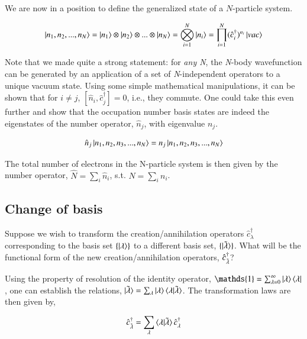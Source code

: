 \documentclass{resonance}
\begin{document}
We are now in a position to define the generalized state of a $N$-particle system. 

\begin{equation*}
    \ket{n_{1}, n_{2},..., n_{N}} = \ket{n_{1}} \otimes \ket{n_{2}} \otimes... \otimes \ket{n_{N}} = \bigotimes _{i = 1}^{N} \ket{n_{i}} = \prod_{i = 1}^{N}(\hat{c}_{i}^{\dagger})^{n_{i}} \ket{vac} 
\end{equation*}

Note that we made quite a strong statement: for \textit{any N},  the \textit{N}-body wavefunction can be generated by an application of a set of \textit{N}-independent operators to a unique vacuum state. Using some simple mathematical manipulations, it can be shown that for $i \neq j$, $[\hat{n}_{i}, \hat{c}_{j}^{\dagger}] = 0$, i.e., they commute. One could take this even further and show that the occupation number basis states are indeed the eigenstates of the number operator, $\hat{n}_{j}$, with eigenvalue $n_{j}$. 

\begin{equation}
    \hat{n}_{j} \ket{n_{1}, n_{2}, n_{3},..., n_{N}} = n_{j}\ket{n_{1}, n_{2}, n_{3},..., n_{N}}
\end{equation}

The total number of electrons in the N-particle system is then given by the number operator, $\hat{N} = \sum_{i} \hat{n}_{i}$, s.t. $N = \sum_{i}n_{i}$. \\


\subsection{Change of basis}
Suppose we wish to transform the creation/annihilation operators $\hat{c}_{\lambda}^{\dagger}$ corresponding to the basis set $\{\ket{\lambda}\}$ to a different basis set, $\{\ket{\Tilde{\lambda}}\}$. What will be the functional form of the new creation/annihilation operators, $\hat{c}_{\Tilde{\lambda}}^{\dagger}$? \par
Using the property of resolution of the identity operator, $\mathds{1} = \sum_{\lambda = 0}^{\infty} \ket{\lambda}\bra{\lambda}$, one can establish the relations, $\ket{\Tilde{\lambda}} = \sum_{\lambda}\ket{\lambda}\braket{\lambda|\Tilde{\lambda}}$. The transformation laws are then given by,

\begin{equation}
    \hat{c}_{\Tilde{\lambda}}^{\dagger} = \sum_{\lambda}\braket{\lambda|\Tilde{\lambda}} \hat{c}_{\lambda}^{\dagger}
\end{equation}
\end{document}
